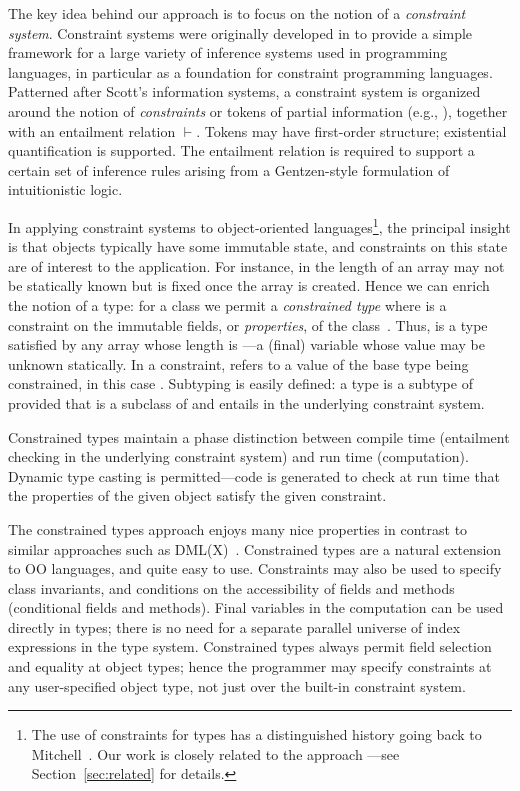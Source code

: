 The key idea behind our approach is to focus on the notion of a
\emph{constraint system}. Constraint systems were originally developed in
\cite{cccc} to provide a simple framework for a large variety of
inference systems used in programming languages, in particular as a
foundation for constraint programming languages.  Patterned after
Scott's information systems, a constraint system is
organized around the notion of \emph{constraints} or tokens of partial
information (e.g., ), together with an entailment
relation $\vdash$.  Tokens may have first-order structure; existential
quantification is supported. The entailment relation is required to
support a certain set of inference rules arising from a Gentzen-style
formulation of intuitionistic logic.

In applying constraint systems to object-oriented
languages\footnote{The use of constraints for types has a
distinguished history going back to Mitchell~\cite{mitchell84}.
Our work is closely related to the \hmx{} approach
\cite{sulzmann97type}---see Section~\ref{sec:related} for
details.}, the principal insight
is that objects typically have some immutable state, and constraints on
this state are of interest to the application.  For instance, in \Java{}
the length of an array may not be statically known but is fixed once
the array is created. Hence we can enrich the notion of a type: for a
class  we permit a \emph{constrained type}  where 
is a
constraint on the immutable fields, or \emph{properties}, of the
class~\cite{constrained-types}. Thus, 
 is a type satisfied by any array whose length
is ---a (final) variable whose value may be unknown
statically. In a constraint,  refers to 
a value of the base type being constrained, in this case .
Subtyping is easily defined: a type  is a
subtype of  
provided that  is a subclass of  and 
entails  in the underlying constraint system.

Constrained types maintain a phase distinction between compile time
(entailment checking in the underlying constraint system) and run time
(computation).  Dynamic type casting is permitted---code is generated
to check at run time that the properties of the given object satisfy
the given constraint.

The constrained types approach enjoys many nice properties in contrast
to similar approaches such as DML(X)~\cite{xi99dependent}.  Constrained
types are a natural extension to OO languages, and quite easy to
use. Constraints may also be used to specify class invariants, and
conditions on the accessibility of fields and methods (conditional
fields and methods).  Final variables in the computation can be used
directly in types; there is no need for a separate parallel universe
of index expressions in the type system.  Constrained types always
permit field selection and equality at object types; hence the
programmer may specify constraints at any user-specified object type,
not just over the built-in constraint system.  

